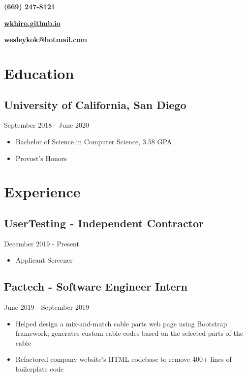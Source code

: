 \documentclass{article}
\makeatletter
\renewcommand{\maketitle}
{
{\noindent\fontsize{40pt}{0pt}\selectfont\bf\color{DarkMidnightBlue} \theauthor} 

{\vspace{-1em}\hfill\large\bf (669) 247-8121}

{\noindent\Huge \href{https://github.com/WKhiro}{\faGithub} \href{https://www.linkedin.com/in/wesley-kok/}{\color{Aquamarine}\faLinkedinSquare}\enspace\large\bf \href{https://wkhiro.github.io/}{\color{NavyBlue} wkhiro.github.io}}

{\vspace{-1.5em}\hfill\large\bf wesleykok@hotmail.com}

}
\makeatother
\begin{document}
\author{Wesley Kok}
\maketitle 		%
\thispagestyle{empty} 	%
\large 			%

\section{Education}

\vspace{-0.5em}
\subsection{University of California, San Diego}\hfill {\color{Carmine}September 2018 - June 2020}
\begin{itemize}
	\itemsep0em
	\item Bachelor of Science in Computer Science, 3.58 GPA
	\item Provost's Honors
\end{itemize}

\vspace{-2em}
\section{Experience}

\vspace{-0.5em}
\subsection{UserTesting - Independent Contractor}\hfill {\color{Carmine}December 2019 - Present}
\begin{itemize}
	\item Applicant Screener
\end{itemize}

\vspace{-1em} 
\subsection{Pactech - Software Engineer Intern}\hfill {\color{Carmine}June 2019 - September 2019}
\begin{itemize}
	\itemsep0em
	\item Helped design a mix-and-match cable parts web page using Bootstrap framework; generates custom cable codes based on the selected parts of the cable
	\item Refactored company website's HTML codebase to remove 400+ lines of boilerplate code
\end{itemize}
\vspace{1.5em}
\end{document}
